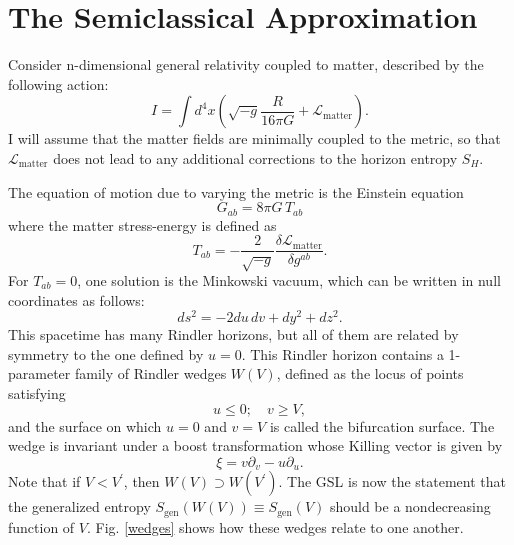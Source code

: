 \documentclass[12pt]{article}
\begin{document}
\section{The Semiclassical Approximation}\label{semi}

Consider n-dimensional general relativity coupled to matter, described by the following action:
\begin{equation}\label{action}
I = \int d^4x (\sqrt{-g}\frac{R}{16\pi G} + \mathcal{L}_\mathrm{matter}).
\end{equation}
I will assume that the matter fields are minimally coupled to the metric, so that $\mathcal{L}_\mathrm{matter}$ does not lead to any additional corrections to the horizon entropy $S_H$.

The equation of motion due to varying the metric is the Einstein equation
\begin{equation}
G_{ab} = 8\pi G\,T_{ab}
\end{equation}
where the matter stress-energy is defined as
\begin{equation}\label{SE}
T_{ab} = -\frac{2}{\sqrt{-g}}\frac{\delta \mathcal{L}_\mathrm{matter}}{\delta g^{ab}}.
\end{equation}
For $T_{ab} = 0$, one solution is the Minkowski vacuum, which can be written in null coordinates as follows:
\begin{equation}\label{null}
ds^2 = -2 du\,dv + dy^2 + dz^2.
\end{equation}
This spacetime has many Rindler horizons, but all of them are related by symmetry to the one defined by $u = 0$.  This Rindler horizon contains a 1-parameter family of Rindler wedges $W(V)$, defined as the locus of points satisfying
\begin{equation}\label{wedge}
u \le 0; \quad v \ge V,
\end{equation}
and the surface on which $u = 0$ and $v = V$ is called the bifurcation surface.  The wedge is invariant under a boost transformation whose Killing vector is given by
\begin{equation}
\xi = v \partial_v - u \partial_u.
\end{equation}
Note that if 
$V < V^\prime$, then $W(V) \supset W(V^\prime)$.  The GSL is now the statement that the generalized entropy $S_\mathrm{gen}(W(V)) \equiv S_\mathrm{gen}(V)$ should be a nondecreasing function of $V$.  Fig. \ref{wedges} shows how these wedges relate to one another.
\end{document}
